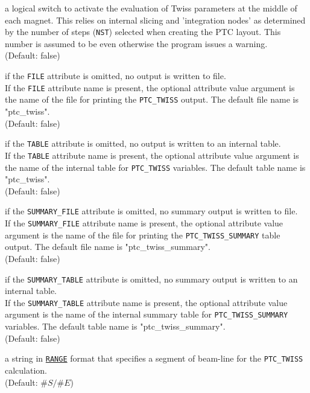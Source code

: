 \begin{madlist}
  a logical switch to activate the evaluation of Twiss
  parameters at the middle of each magnet. This relies on internal slicing
  and 'integration nodes' as determined by the number of steps ({\tt NST})
  selected when creating the PTC layout. This number is assumed to be even
  otherwise the program issues a warning. \\
  (Default: false)

  if the {\tt FILE} attribute is omitted, no output is
  written to file. \\ If the {\tt FILE} attribute name is present, the
  optional attribute value argument is the name of the file for printing
  the {\tt PTC\_TWISS} output. The default file name is
  "ptc\_twiss". \\ 
  (Default: false)

  if the {\tt TABLE} attribute is omitted, no output is
  written to an internal table. \\ If the {\tt TABLE} attribute name is
  present, the optional attribute value argument is the name of the
  internal table for {\tt PTC\_TWISS} variables. The default table name
  is "ptc\_twiss". \\ 
  (Default: false)

  if the {\tt SUMMARY\_FILE} attribute is omitted, no summary output is
  written to file. \\  
  If the {\tt SUMMARY\_FILE} attribute name is present, the optional
  attribute value argument is the name of the file for printing the 
  {\tt PTC\_TWISS\_SUMMARY} table output. The default file name is
  "ptc\_twiss\_summary". \\
  (Default: false)

  if the {\tt SUMMARY\_TABLE} attribute is omitted, no summary output is
  written to an internal table. \\ 
  If the {\tt SUMMARY\_TABLE} attribute name is present, the optional
  attribute value argument is the name of the internal summary table for
  {\tt PTC\_TWISS\_SUMMARY} variables. The default table name is 
  "ptc\_twiss\_summary".  \\ 
  (Default: false)

  a string in \hyperref[sec:range]{\tt RANGE} format that
  specifies a segment of beam-line for the {\tt PTC\_TWISS}
  calculation. \\ 
  (Default: $\#S/\#E$)


\end{madlist}
